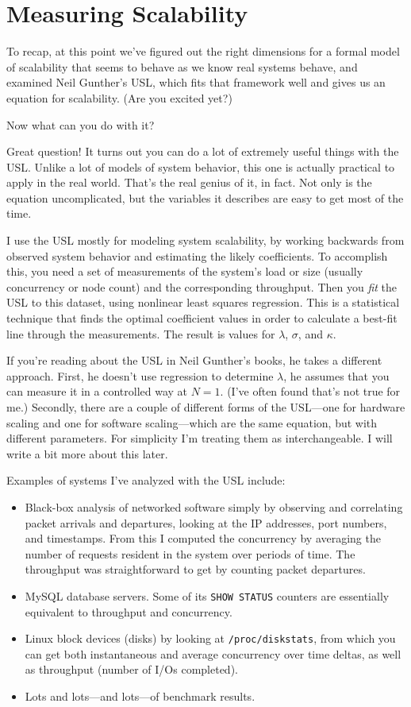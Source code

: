 \documentclass{vivid_layout}
\begin{document}
\newpage
\section{Measuring Scalability}

To recap, at this point we've figured out the right dimensions for a formal
model of scalability that seems to behave as we know real systems behave, and
examined Neil Gunther's USL, which fits that framework well and gives us an
equation for scalability. (Are you excited yet?)

Now what can you do with it?

Great question! It turns out you can do a lot of extremely useful things with
the USL.  Unlike a lot of models of system behavior, this one is actually
practical to apply in the real world. That's the real genius of it, in fact. Not
only is the equation uncomplicated, but the variables it describes are easy to
get most of the time.

I use the USL mostly for modeling system scalability, by working backwards from
observed system behavior and estimating the likely coefficients. To accomplish
this, you need a set of measurements of the system's load or size (usually
concurrency or node count) and the corresponding throughput. Then you {\itshape
fit} the USL to this dataset, using nonlinear least squares regression. This is
a statistical technique that finds the optimal coefficient values in order to
calculate a best-fit line through the measurements. The result is values for
$\lambda$, $\sigma$, and $\kappa$.

If you're reading about the USL in Neil Gunther's books, he takes a different
approach. First, he doesn't use regression to determine $\lambda$, he assumes
that you can measure it in a controlled way at $N=1$. (I've often found that's
not true for me.) Secondly, there are a couple of different forms of the
USL---one for hardware scaling and one for software scaling---which are the same
equation, but with different parameters. For simplicity I'm treating them as
interchangeable. I will write a bit more about this later.

Examples of systems I've analyzed with the USL include:

\begin{itemize}
\item Black-box analysis of networked software simply by observing and
correlating packet arrivals and departures, looking at the IP addresses, port
numbers, and timestamps. From this I computed the concurrency by averaging the
number of requests resident in the system over periods of time. The
throughput was straightforward to get by counting packet departures.
\item MySQL database servers. Some of its \texttt{SHOW STATUS} counters are
essentially equivalent to throughput and concurrency.
\item Linux block devices (disks) by looking at \texttt{/proc/diskstats}, from
which you can get both instantaneous and average concurrency over time deltas,
as well as throughput (number of I/Os completed).
\item Lots and lots---and lots---of benchmark results.
\end{itemize}
\end{document}
